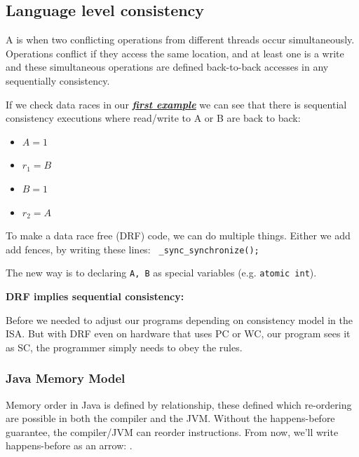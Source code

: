 \subsection{Language level consistency}
    \begin{tcolorbox}[vert]
        A  is when two conflicting operations from different threads occur simultaneously. Operations conflict if they access the same location, and at least one is a write and these simultaneous operations are defined back-to-back accesses in any sequentially consistency.
    \end{tcolorbox}
    If we check data races in our \hyperlink{consistency}{\textbf{\textit{first example}}} we can see that there is sequential consistency executions where read/write to A or B are back to back:
    \begin{itemize}[left=10pt, label=\textbullet]
        \item $A=1$
        \item $r_1=B$
        \item $B=1$
        \item $r_2 = A$
    \end{itemize}
    \begin{tcolorbox}[rouge]
        To make a data race free (DRF) code, we can do multiple things. Either we add add fences, by writing these lines: \lstinline! _sync_synchronize();!

        The new way is to declaring \lstinline!A, B! as special variables (e.g. \lstinline!atomic int!).
    \end{tcolorbox}

    \textbf{DRF implies sequential consistency:}

    Before we needed to adjust our programs depending on consistency model in the ISA. But with DRF even on hardware that uses PC or WC, our program sees it as SC, the programmer simply needs to obey the rules.

    \subsubsection{Java Memory Model}

    \begin{tcolorbox}[vert]
        Memory order in Java is defined by  relationship, these defined which re-ordering are possible in both the compiler and the JVM. Without the happens-before guarantee, the compiler/JVM can reorder instructions. From now, we'll write happens-before as an arrow: \textrightarrow. 
    \end{tcolorbox}

